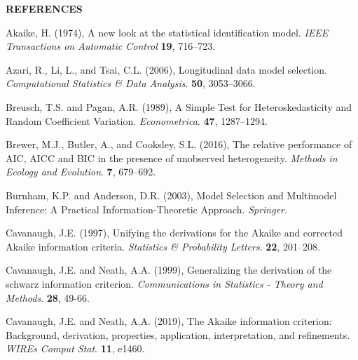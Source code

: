 
\begin{center}
\textbf{REFERENCES}
\end{center}
\singlespace

\phantom{a}

\rff Akaike, H. (1974),
      A new look at the statistical identification model.
     {\it IEEE Transactions on Automatic Control}
     {\bf 19}, {716--723}.

\phantom{a}

\rff Azari, R., Li, L., and Tsai, C.L. (2006),
      Longitudinal data model selection.
      {\it Computational Statistics \& Data Analysis}.
      {\bf 50}, {3053--3066}.

\phantom{a}

\rff Breusch, T.S. and Pagan, A.R. (1989),
      A Simple Test for Heteroskedasticity and Random Coefficient Variation.
      {\it Econometrica}.
      {\bf 47}, {1287--1294}.

\phantom{a}

\rff Brewer, M.J., Butler, A., and Cooksley, S.L. (2016),
      The relative performance of AIC, AICC and BIC in the presence of unobserved heterogeneity.
      {\it Methods in Ecology and Evolution}.
      {\bf 7}, {679--692}.

\phantom{a}

\rff Burnham, K.P. and Anderson, D.R. (2003),
      Model Selection and Multimodel Inference: A Practical Information-Theoretic Approach.
      {\it Springer}.

\phantom{a}

\rff Cavanaugh, J.E. (1997),
      Unifying the derivations for the Akaike and corrected Akaike information criteria.
      {\it Statistics \& Probability Letters}.
      {\bf 22}, {201--208}.

\phantom{a}

\rff Cavanaugh, J.E. and Neath, A.A. (1999),
      Generalizing the derivation of the schwarz information criterion.
      {\it Communications in Statistics - Theory and Methods}.
      {\bf 28}, {49-66}.

\phantom{a}

\rff Cavanaugh, J.E. and Neath, A.A. (2019),
      The Akaike information criterion: Background, derivation, properties, application, interpretation, and refinements.
      {\it WIREs Comput Stat}.
      {\bf 11}, {e1460}.

\phantom{a}

